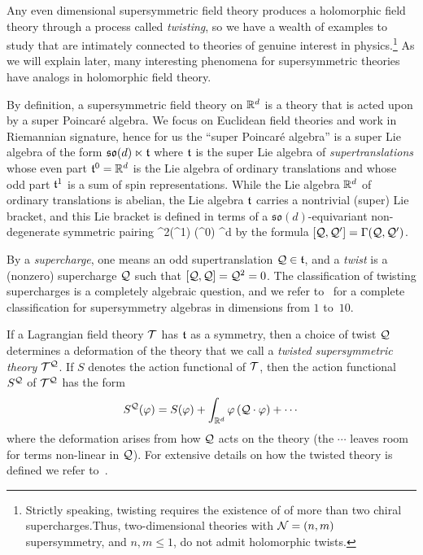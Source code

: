 \documentclass[11pt]{amsart}
\begin{document}
Any even dimensional supersymmetric field theory produces a holomorphic field theory through a process called {\em twisting},
so we have a wealth of examples to study that are intimately connected to theories of genuine interest in physics.\footnote{Strictly speaking, twisting requires the existence of of more than two chiral supercharges.Thus, two-dimensional theories with $\mathcal N = (n,m)$ supersymmetry, and $n,m \leq 1$, do not admit holomorphic twists.}
As we will explain later, many interesting phenomena for supersymmetric theories have analogs in holomorphic field theory.
 
By definition, a supersymmetric field theory on $\mathbb R^d$ is a theory that is acted upon by a super Poincar\'{e} algebra. 
We focus on Euclidean field theories and work in Riemannian signature,
hence for us the ``super Poincar\'{e} algebra'' is a super Lie algebra of the form
$\mathfrak{so}(d) \ltimes \mathfrak t$
where $\mathfrak t$ is the super Lie algebra of {\em supertranslations} whose even part $\mathfrak t^0 = \mathbb R^d$ is the Lie algebra of ordinary translations and whose odd part $\mathfrak t^1$ is a sum of spin representations. 
While the Lie algebra $\mathbb R^d$ of ordinary translations is abelian, the Lie algebra $\mathfrak t$ carries a nontrivial (super) Lie bracket,
and this Lie bracket is defined in terms of a $\mathfrak{so}(d)$-equivariant non-degenerate symmetric pairing
\beqn
\label{e:Gamma}
\Gamma {}^2(\ft^{1}) (\ft^0) \cong \RR^d 
\eeqn
by the formula $[\mathcal Q, \mathcal Q'] = \Gamma(\mathcal Q, \mathcal Q')$. 

By a {\em supercharge}, one means an odd supertranslation $\mathcal Q \in \mathfrak t$, and
a {\em twist} is a (nonzero) supercharge $\mathcal Q$ such that $[\mathcal Q,\mathcal Q] = \mathcal Q^2 = 0$. 
The classification of twisting supercharges is a completely algebraic question,
and we refer to~\autocite{ESsusy} for a complete classification for supersymmetry algebras in dimensions from $1$ to~$10$. 

If a Lagrangian field theory $\mathcal T$ has $\mathfrak t$ as a symmetry, 
then a choice of twist $\mathcal Q$ determines a deformation of the theory that we call a {\em twisted supersymmetric theory} $\mathcal T^\mathcal Q$.
If $S$ denotes the action functional of $\mathcal T$, then the action functional $S^\mathcal Q$ of $\mathcal T^\mathcal Q$ has the form
\[
S^\mathcal Q(\varphi) = S(\varphi) + \int_{\mathbb R^d} \varphi  \left(\mathcal Q \cdot \varphi \right) + \cdots 
\]
where the deformation arises from how $\mathcal Q$ acts on the theory 
(the $\cdots$ leaves room for terms non-linear in $\mathcal Q$).
For extensive details on how the twisted theory is defined we refer to~\autocite{CostelloHolomorphic, ESW}. 
\end{document}
